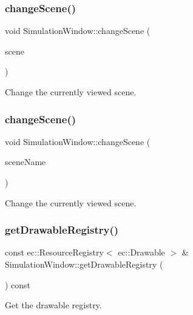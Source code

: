 \subsubsection{\texorpdfstring{change\+Scene()}{changeScene()}\hspace{0.1cm}{\footnotesize\ttfamily [1/2]}}
{\footnotesize\ttfamily void Simulation\+Window\+::change\+Scene (\begin{DoxyParamCaption}\item[{\mbox{\hyperlink{class_simulation_scene}{Simulation\+Scene}} $\ast$}]{scene }\end{DoxyParamCaption})}

Change the currently viewed scene. \mbox{\label{class_simulation_window_a49e6df3f3396dbbe16dbc64c1ed7b315}} 
\subsubsection{\texorpdfstring{change\+Scene()}{changeScene()}\hspace{0.1cm}{\footnotesize\ttfamily [2/2]}}
{\footnotesize\ttfamily void Simulation\+Window\+::change\+Scene (\begin{DoxyParamCaption}\item[{const std\+::string \&}]{scene\+Name }\end{DoxyParamCaption})}

Change the currently viewed scene. \mbox{\label{class_simulation_window_ae04cef316702d65cf4d6e119fa4c6cae}} 
\subsubsection{\texorpdfstring{get\+Drawable\+Registry()}{getDrawableRegistry()}}
{\footnotesize\ttfamily const ec\+::\+Resource\+Registry$<$ ec\+::\+Drawable $>$ \& Simulation\+Window\+::get\+Drawable\+Registry (\begin{DoxyParamCaption}{ }\end{DoxyParamCaption}) const}

Get the drawable registry. \mbox{\label{class_simulation_window_aee0f598e5e41c2c4d8142075a294c13a}} 
